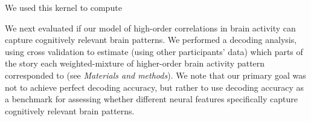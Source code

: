 We used this kernel to compute 






We next evaluated if our model of high-order correlations in brain activity can capture cognitively relevant brain patterns. We performed a decoding analysis, using cross validation to estimate (using other participants’ data) which parts of the story each weighted-mixture of higher-order brain activity pattern corresponded to (see \textit{Materials and methods}). We note that our primary goal was not to achieve perfect decoding accuracy, but rather to use decoding accuracy as a benchmark for assessing whether different neural features specifically capture cognitively relevant brain patterns.

